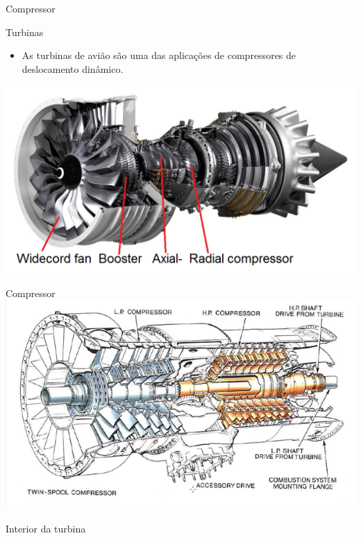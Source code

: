 \begin{frame}{Compressor}
	\begin{block}{Turbinas}
		\begin{itemize}
			\item As turbinas de avião são uma das aplicações de compressores de deslocamento dinâmico.
		\end{itemize}
	\end{block}
	
	\vspace{0.5cm}

	\centering
	\includegraphics[width=0.8\linewidth]{Figuras/Ch12/fig9}

\end{frame}


\begin{frame}{Compressor}
	\centering
	\includegraphics[width=1\linewidth]{Figuras/Ch12/fig8}

	Interior da turbina
\end{frame}


